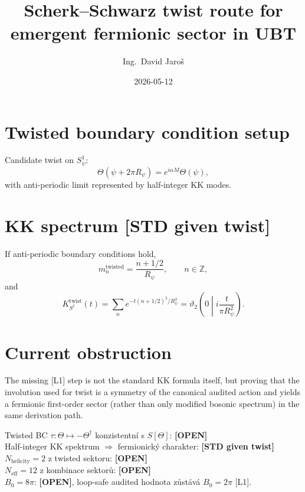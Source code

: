 \documentclass[12pt,a4paper]{article}
\title{Scherk--Schwarz twist route for emergent fermionic sector in UBT}
\author{Ing.\ David Jaroš}
\date{2026-05-12}
\begin{document}
\maketitle

\section{Twisted boundary condition setup}
Candidate twist on $S^1_\psi$:
\[
\Theta(\psi+2\pi R_\psi)=e^{i\alpha M}\Theta(\psi),
\]
with anti-periodic limit represented by half-integer KK modes.

\section{KK spectrum [STD given twist]}
If anti-periodic boundary conditions hold,
\[
m_n^{\mathrm{twisted}}=\frac{n+1/2}{R_\psi},\qquad n\in\mathbb{Z},
\]
and
\[
K_{S^1}^{\mathrm{twist}}(t)=\sum_n e^{-t(n+1/2)^2/R_\psi^2}=\vartheta_2\!
\left(0\middle|i\frac{t}{\pi R_\psi^2}\right).
\]

\section{Current obstruction}
The missing [L1] step is not the standard KK formula itself, but proving that the involution used for twist is a symmetry of the canonical audited action and yields a fermionic first-order sector (rather than only modified bosonic spectrum) in the same derivation path.

\begin{statusbox}
Twisted BC $\tau: \Theta\mapsto-\Theta^\dagger$ konzistentní s $S[\Theta]$: \textbf{[OPEN]}\\
Half-integer KK spektrum $\Rightarrow$ fermionický charakter: \textbf{[STD given twist]}\\
$N_{\mathrm{helicity}}=2$ z twisted sektoru: \textbf{[OPEN]}\\
$N_{\mathrm{eff}}=12$ z kombinace sektorů: \textbf{[OPEN]}\\
$B_0=8\pi$: \textbf{[OPEN]}, loop-safe audited hodnota zůstává $B_0=2\pi$ [L1].
\end{statusbox}
\end{document}
